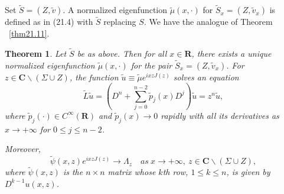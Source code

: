 \documentclass{surv-l}
\theoremstyle{plain}
\newtheorem{theorem}{Theorem}[section]
\theoremstyle{definition}
\numberwithin{equation}{chapter}
\begin{document}
Set $\tilde{S}=(Z, \tilde{v})$. A normalized eigenfunction $\tilde{\mu}(x, \cdot)$ for $\tilde{S}_{x}=(Z, \tilde{v}_{x})$ is defined as in (21.4) with $\tilde{S}$ replacing $S$. We have the analogue of Theorem ~\ref{thm21.11}.
\renewcommand\thetheorem{32.\arabic{theorem}}
\setcounter{theorem}{5}
\begin{theorem}\label{thm32.6}
Let $\tilde{S}$ be as above. Then for all $x \in \mathbf{R}$, there exists a unique normalized eigenfunction $\tilde{\mu}(x, \cdot)$ for the pair $\tilde{S}_{x}= (Z, \tilde{v}_{x})$. For $z\in \mathbf{C}\backslash (\Sigma\cup Z)$, the function $\tilde{u}\equiv\tilde{\mu}e^{ixzJ(z)}$ solves an equation
\setcounter{equation}{6}
\begin{equation}\label{eq32.7}
\tilde{L}\tilde{u}=\left(D^{n}+\sum_{j=0}^{n-2}\tilde{p}_{j}(x)D^{j}\right)\tilde{u}=z^{n}\tilde{u},
\end{equation}
where $\tilde{p}_{j}(\cdot)\in C^{\infty}(\mathbf{R})$ and $\tilde{p}_{j}(x) \rightarrow 0$ rapidly with all its derivatives as $ x\rightarrow+\infty$ for $0\leq j\leq n-2$.

Moreover,
\begin{equation}\label{eq32.8}
\tilde{\psi}(x, z)e^{ixzJ(z)}\rightarrow\Lambda_{z}\quad as\  x\rightarrow +\infty,\ z\in \mathbf{C}\backslash (\Sigma\cup Z),
\end{equation}
where $\tilde{\psi}(x, z)$ is the $n\times n$ matrix whose $k$th row, $1 \leq k\leq n$, is given by $D^{k-1}u(x, z)$.
\end{theorem}
\end{document}
